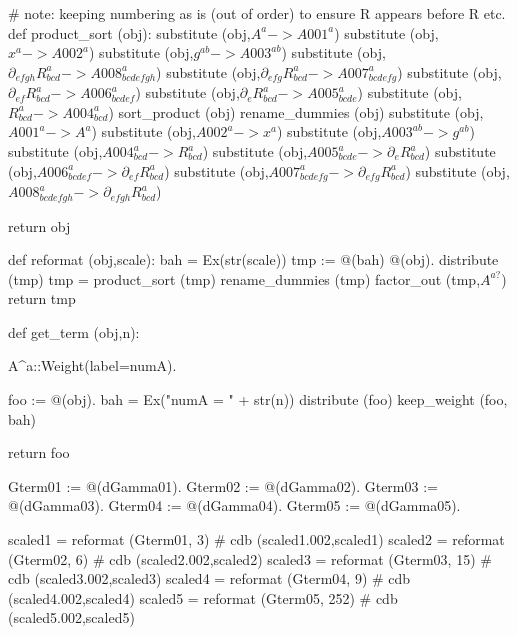 \documentclass[12pt]{cdblatex}
\begin{document}
\begin{cadabra}
   # note: keeping numbering as is (out of order) to ensure R appears before \nabla R etc.
   def product_sort (obj):
       substitute (obj,$ A^{a}                              -> A001^{a}                 $)
       substitute (obj,$ x^{a}                              -> A002^{a}                 $)
       substitute (obj,$ g^{a b}                            -> A003^{a b}               $)
       substitute (obj,$ \partial_{e f g h}{R^{a}_{b c d}}  -> A008^{a}_{b c d e f g h} $)
       substitute (obj,$ \partial_{e f g}{R^{a}_{b c d}}    -> A007^{a}_{b c d e f g}   $)
       substitute (obj,$ \partial_{e f}{R^{a}_{b c d}}      -> A006^{a}_{b c d e f}     $)
       substitute (obj,$ \partial_{e}{R^{a}_{b c d}}        -> A005^{a}_{b c d e}       $)
       substitute (obj,$ R^{a}_{b c d}                      -> A004^{a}_{b c d}         $)
       sort_product   (obj)
       rename_dummies (obj)
       substitute (obj,$ A001^{a}                  -> A^{a}                             $)
       substitute (obj,$ A002^{a}                  -> x^{a}                             $)
       substitute (obj,$ A003^{a b}                -> g^{a b}                           $)
       substitute (obj,$ A004^{a}_{b c d}          -> R^{a}_{b c d}                     $)
       substitute (obj,$ A005^{a}_{b c d e}        -> \partial_{e}{R^{a}_{b c d}}       $)
       substitute (obj,$ A006^{a}_{b c d e f}      -> \partial_{e f}{R^{a}_{b c d}}     $)
       substitute (obj,$ A007^{a}_{b c d e f g}    -> \partial_{e f g}{R^{a}_{b c d}}   $)
       substitute (obj,$ A008^{a}_{b c d e f g h}  -> \partial_{e f g h}{R^{a}_{b c d}} $)

       return obj

   def reformat (obj,scale):
       bah  = Ex(str(scale))
       tmp := @(bah) @(obj).
       distribute     (tmp)
       tmp = product_sort (tmp)
       rename_dummies (tmp)
       factor_out     (tmp,$A^{a?}$)
       return tmp

   def get_term (obj,n):

       A^{a}::Weight(label=numA).

       foo := @(obj).
       bah  = Ex("numA = " + str(n))
       distribute  (foo)
       keep_weight (foo, bah)

       return foo

   Gterm01 := @(dGamma01).
   Gterm02 := @(dGamma02).
   Gterm03 := @(dGamma03).
   Gterm04 := @(dGamma04).
   Gterm05 := @(dGamma05).

   scaled1 = reformat (Gterm01,   3)   # cdb (scaled1.002,scaled1)
   scaled2 = reformat (Gterm02,   6)   # cdb (scaled2.002,scaled2)
   scaled3 = reformat (Gterm03,  15)   # cdb (scaled3.002,scaled3)
   scaled4 = reformat (Gterm04,   9)   # cdb (scaled4.002,scaled4)
   scaled5 = reformat (Gterm05, 252)   # cdb (scaled5.002,scaled5)

\end{cadabra}
\end{document}
